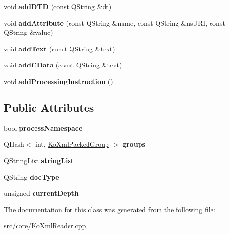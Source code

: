 \begin{DoxyCompactItemize}
\item 
\hypertarget{classKoXmlPackedDocument_affb87cf7f7374546a31bd03d73b0face}{
void {\bfseries addDTD} (const QString \&dt)}
\label{classKoXmlPackedDocument_affb87cf7f7374546a31bd03d73b0face}

\item 
\hypertarget{classKoXmlPackedDocument_a07ab44eb55ebfcf28b82dd6387836321}{
void {\bfseries addAttribute} (const QString \&name, const QString \&nsURI, const QString \&value)}
\label{classKoXmlPackedDocument_a07ab44eb55ebfcf28b82dd6387836321}

\item 
\hypertarget{classKoXmlPackedDocument_a858ddb946edb6b0f4dd7868543811618}{
void {\bfseries addText} (const QString \&text)}
\label{classKoXmlPackedDocument_a858ddb946edb6b0f4dd7868543811618}

\item 
\hypertarget{classKoXmlPackedDocument_a39e2ed4fd8eded4ee1e27d42abf26ffc}{
void {\bfseries addCData} (const QString \&text)}
\label{classKoXmlPackedDocument_a39e2ed4fd8eded4ee1e27d42abf26ffc}

\item 
\hypertarget{classKoXmlPackedDocument_a213dcb1d72658c165aebf7c237fc113e}{
void {\bfseries addProcessingInstruction} ()}
\label{classKoXmlPackedDocument_a213dcb1d72658c165aebf7c237fc113e}

\end{DoxyCompactItemize}
\subsection*{Public Attributes}
\begin{DoxyCompactItemize}
\item 
\hypertarget{classKoXmlPackedDocument_a73d2abdc609f9bfcb7d631916e162d23}{
bool {\bfseries processNamespace}}
\label{classKoXmlPackedDocument_a73d2abdc609f9bfcb7d631916e162d23}

\item 
\hypertarget{classKoXmlPackedDocument_a5d9b03cc94aab66b47595041535cd6d3}{
QHash$<$ int, \hyperlink{classKoXmlVector}{KoXmlPackedGroup} $>$ {\bfseries groups}}
\label{classKoXmlPackedDocument_a5d9b03cc94aab66b47595041535cd6d3}

\item 
\hypertarget{classKoXmlPackedDocument_a0231674b1547d915ebea59fcb5dcb348}{
QStringList {\bfseries stringList}}
\label{classKoXmlPackedDocument_a0231674b1547d915ebea59fcb5dcb348}

\item 
\hypertarget{classKoXmlPackedDocument_a04d5fe2a9166fa9610b11921ee59fc45}{
QString {\bfseries docType}}
\label{classKoXmlPackedDocument_a04d5fe2a9166fa9610b11921ee59fc45}

\item 
\hypertarget{classKoXmlPackedDocument_a8eddebd81c939131fa4f260f57b6c967}{
unsigned {\bfseries currentDepth}}
\label{classKoXmlPackedDocument_a8eddebd81c939131fa4f260f57b6c967}

\end{DoxyCompactItemize}


The documentation for this class was generated from the following file:\begin{DoxyCompactItemize}
\item 
src/core/KoXmlReader.cpp\end{DoxyCompactItemize}
